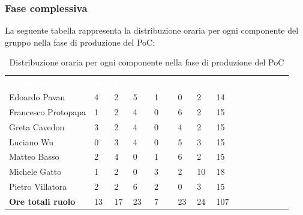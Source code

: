 \subsubsection{Fase complessiva}
La seguente tabella rappresenta la distribuzione oraria per ogni componente del gruppo nella fase di produzione del PoC:
\begin{table}[H]
\begin{center}
\renewcommand{\arraystretch}{1.25}
\begin{tabular}{ m{}<{\centering}  m{}<{\centering} m{}<{\centering} m{}<{\centering}  m{}<{\centering}  m{}<{\centering}  m{}<{\centering}  m{}<{\centering}   }
	\rowcolor{darkblue}
	\textcolor{white}{\textbf{Componente}} &\textcolor{white}{\textbf{Re}}&\textcolor{white}{\textbf{Pt}}&\textcolor{white}{\textbf{An}}&\textcolor{white}{\textbf{Am}}&\textcolor{white}{\textbf{Pr}}&\textcolor{white}{\textbf{Ve}}&\textcolor{white}{\textbf{Ore complessive}}\\ 
	Edoardo Pavan & 4 & 2 & 5 & 1 & 0 & 2 & 14 \\	
	
	Francesco Protopapa & 1 & 2 & 4 & 0 & 6 & 2 & 15 \\

	Greta Cavedon & 3 & 2 & 4 & 0 & 4& 2 & 15 \\
	
	Luciano Wu & 0 & 3 & 4 & 0 & 5 & 3 & 15\\
	
	Matteo Basso & 2 & 4 & 0 & 1 & 6 & 2 & 15 \\
	
	Michele Gatto & 1 & 2 & 0 & 3 & 2 & 10 & 18\\
	
	Pietro Villatora & 2 & 2 & 6 & 2 & 0 & 3 & 15 \\
	
	\textbf{Ore totali ruolo} & 13 & 17 & 23 & 7 & 23 & 24 & 107\\

\end{tabular}
\caption{Distribuzione oraria per ogni componente nella fase di produzione del PoC}
\end{center}
\end{table}

